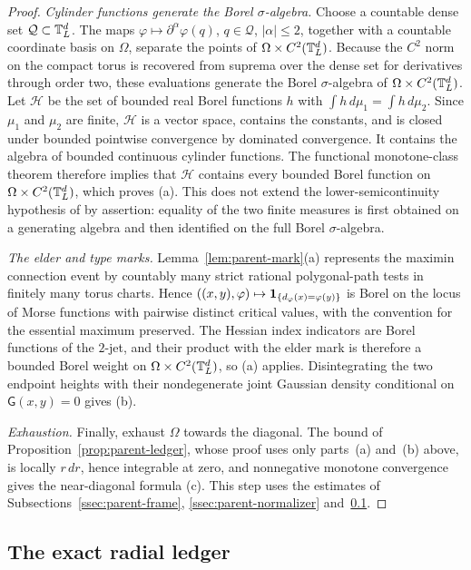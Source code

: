\begin{proof}
\emph{Cylinder functions generate the Borel $\sigma$-algebra.} Choose a countable dense set $\mathcal Q\subset\mathbb T^d_L$. The maps $\varphi\mapsto\partial^\alpha\varphi(q)$, $q\in\mathcal Q$, $|\alpha|\le2$, together with a countable coordinate basis on $\Omega$, separate the points of $\Omega\times C^2(\mathbb T^d_L)$. Because the $C^2$ norm on the compact torus is recovered from suprema over the dense set for derivatives through order two, these evaluations generate the Borel $\sigma$-algebra of $\Omega\times C^2(\mathbb T^d_L)$. Let $\mathcal H$ be the set of bounded real Borel functions $h$ with $\int h\,d\mu_1=\int h\,d\mu_2$. Since $\mu_1$ and $\mu_2$ are finite, $\mathcal H$ is a vector space, contains the constants, and is closed under bounded pointwise convergence by dominated convergence. It contains the algebra of bounded continuous cylinder functions. The functional monotone-class theorem therefore implies that $\mathcal H$ contains every bounded Borel function on $\Omega\times C^2(\mathbb T^d_L)$, which proves (a). This does not extend the lower-semicontinuity hypothesis of \cite[Theorem~7.1]{AAL} by assertion: equality of the two finite measures is first obtained on a generating algebra and then identified on the full Borel $\sigma$-algebra.

\emph{The elder and type marks.} Lemma~\ref{lem:parent-mark}(a) represents the maximin connection event by countably many strict rational polygonal-path tests in finitely many torus charts. Hence $((x,y),\varphi)\mapsto\mathbf 1_{\{d_\varphi(x)=\varphi(y)\}}$ is Borel on the locus of Morse functions with pairwise distinct critical values, with the convention for the essential maximum preserved. The Hessian index indicators are Borel functions of the $2$-jet, and their product with the elder mark is therefore a bounded Borel weight on $\Omega\times C^2(\mathbb T^d_L)$, so (a) applies. Disintegrating the two endpoint heights with their nondegenerate joint Gaussian density conditional on $\mathsf G(x,y)=0$ gives (b).

\emph{Exhaustion.} Finally, exhaust $\Omega$ towards the diagonal. The bound of Proposition~\ref{prop:parent-ledger}, whose proof uses only parts~(a) and~(b) above, is locally $r\,dr$, hence integrable at zero, and nonnegative monotone convergence gives the near-diagonal formula (c). This step uses the estimates of Subsections~\ref{ssec:parent-frame}, \ref{ssec:parent-normalizer} and~\ref{ssec:parent-ledger}.
\end{proof}

\subsection{The exact radial ledger}\label{ssec:parent-ledger}

